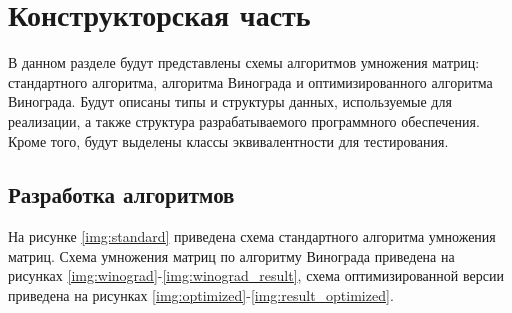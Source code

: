 \chapter{Конструкторская часть}

В данном разделе будут представлены схемы алгоритмов умножения матриц: стандартного алгоритма, алгоритма Винограда и оптимизированного алгоритма Винограда. Будут описаны типы и структуры данных, используемые для реализации, а также структура разрабатываемого программного обеспечения. Кроме того, будут выделены классы эквивалентности для тестирования.

\section{Разработка алгоритмов}

На рисунке \ref{img:standard} приведена схема стандартного алгоритма умножения матриц. 
Схема умножения матриц по алгоритму Винограда приведена на рисунках \ref{img:winograd}-\ref{img:winograd_result}, схема оптимизированной версии приведена на рисунках \ref{img:optimized}-\ref{img:result_optimized}.

